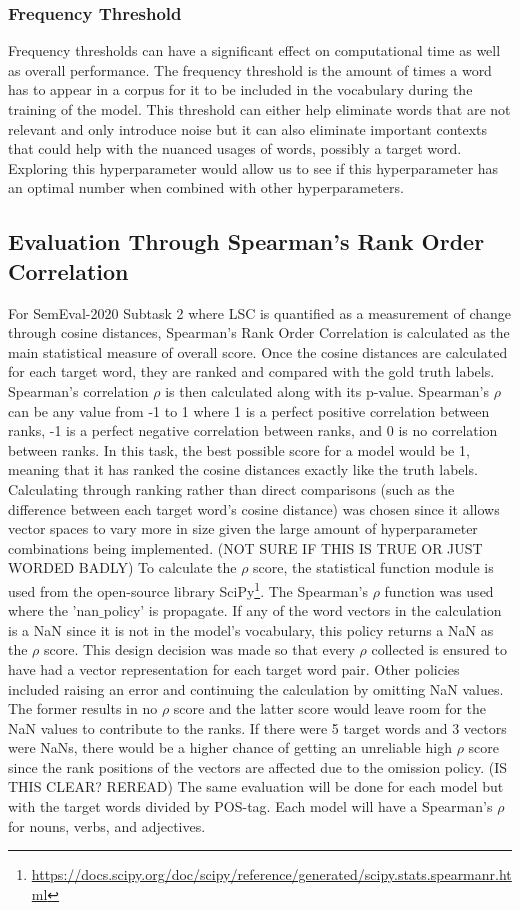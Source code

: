 \subsubsection{Frequency Threshold}
Frequency thresholds can have a significant effect on computational time as well as overall performance. The frequency threshold is the amount of times a word has to appear in a corpus for it to be included in the vocabulary during the training of the model. This threshold can either help eliminate words that are not relevant and only introduce noise but it can also eliminate important contexts that could help with the nuanced usages of words, possibly a target word. Exploring this hyperparameter would allow us to see if this hyperparameter has an optimal number when combined with other hyperparameters. 

\subsection{Evaluation Through Spearman's Rank Order Correlation}
For SemEval-2020 Subtask 2 where LSC is quantified as a measurement of change through cosine distances, Spearman’s Rank Order Correlation is calculated as the main statistical measure of overall score. Once the cosine distances are calculated for each target word, they are ranked and compared with the gold truth labels. Spearman's correlation $\rho$ is then calculated along with its p-value. Spearman’s $\rho$ can be any value from -1 to 1 where 1 is a perfect positive correlation between ranks, -1 is a perfect negative correlation between ranks, and 0 is no correlation between ranks. In this task, the best possible score for a model would be 1, meaning that it has ranked the cosine distances exactly like the truth labels. Calculating through ranking rather than direct comparisons (such as the difference between each target word’s cosine distance) was chosen since it allows vector spaces to vary more in size given the large amount of hyperparameter combinations being implemented. (NOT SURE IF THIS IS TRUE OR JUST WORDED BADLY) To calculate the $\rho$ score, the statistical function module is used from the open-source library SciPy\footnote{\url{https://docs.scipy.org/doc/scipy/reference/generated/scipy.stats.spearmanr.html}}. The Spearman's $\rho$ function was used where the 'nan$\_$policy' is propagate. If any of the word vectors in the calculation is a NaN since it is not in the model's vocabulary, this policy returns a NaN as the $\rho$ score. This design decision was made so that every $\rho$ collected is ensured to have had a vector representation for each target word pair. Other policies included raising an error and continuing the calculation by omitting NaN values. The former results in no $\rho$ score and the latter score would leave room for the NaN values to contribute to the ranks. If there were 5 target words and 3 vectors were NaNs, there would be a higher chance of getting an unreliable high $\rho$ score since the rank positions of the vectors are affected due to the omission policy. (IS THIS CLEAR? REREAD) The same evaluation will be done for each model but with the target words divided by POS-tag. Each model will have a Spearman’s $\rho$ for nouns, verbs, and adjectives. 

